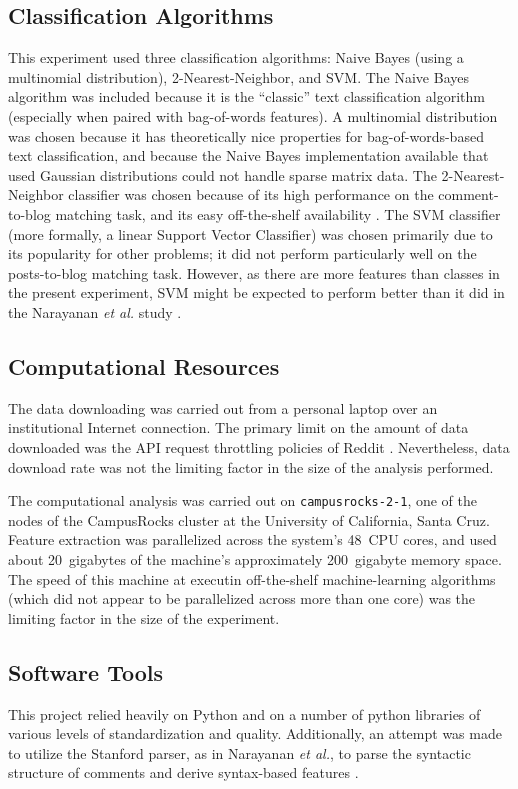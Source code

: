 \documentclass{article}
\begin{document}
\subsection{Classification Algorithms}
This experiment used three classification algorithms: Naive Bayes (using a multinomial distribution), 2-Nearest-Neighbor, and SVM. The Naive Bayes algorithm was included because it is the ``classic'' text classification algorithm (especially when paired with bag-of-words features). A multinomial distribution was chosen because it has theoretically nice properties for bag-of-words-based text classification, and because the Naive Bayes implementation available that used Gaussian distributions could not handle sparse matrix data. The 2-Nearest-Neighbor classifier was chosen because of its high performance on the comment-to-blog matching task, and its easy off-the-shelf availability \cite{narayanan2012feasibility, pedregosa2011scikit}. The SVM classifier (more formally, a linear Support Vector Classifier) was chosen primarily due to its popularity for other problems; it did not perform particularly well on the posts-to-blog matching task. However, as there are more features than classes in the present experiment, SVM might be expected to perform better than it did in the Narayanan \textit{et al.} study \cite{narayanan2012feasibility}.

\subsection{Computational Resources}
The data downloading was carried out from a personal laptop over an institutional Internet connection. The primary limit on the amount of data downloaded was the API request throttling policies of Reddit \cite{boe2012python}. Nevertheless, data download rate was not the limiting factor in the size of the analysis performed.

The computational analysis was carried out on \texttt{campusrocks-2-1}, one of the nodes of the CampusRocks cluster at the University of California, Santa Cruz. Feature extraction was parallelized across the system's 48~CPU cores, and used about 20~gigabytes of the machine's approximately 200~gigabyte memory space. The speed of this machine at executin off-the-shelf machine-learning algorithms (which did not appear to be parallelized across more than one core) was the limiting factor in the size of the experiment.

\subsection{Software Tools}
This project relied heavily on Python and on a number of python libraries of various levels of standardization and quality. Additionally, an attempt was made to utilize the Stanford parser, as in Narayanan \textit{et al.}, to parse the syntactic structure of comments and derive syntax-based features \cite{klein2003accurate, narayanan2012feasibility}.
\end{document}
